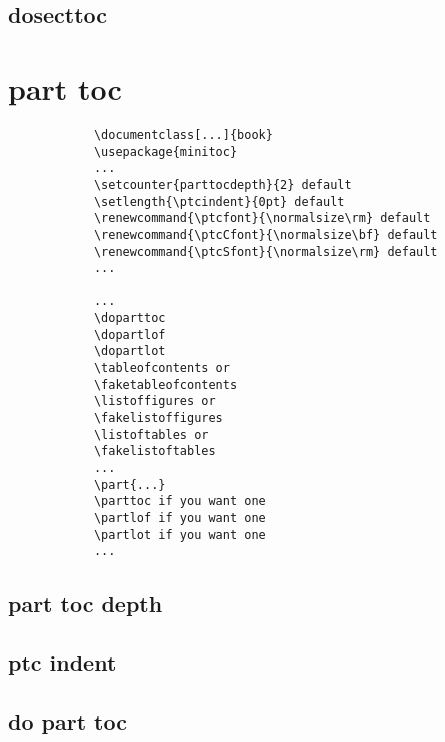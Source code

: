 		\subsection{dosecttoc}



		
		\newpage
	\section{part  toc }



		\singlespace
		\setlength{\fboxsep}{12pt}
		\begin{boxedminipage}[c]{1.0\linewidth}
		\color{blue}
		\begin{verbatim}
			\documentclass[...]{book}
			\usepackage{minitoc}
			...
			\setcounter{parttocdepth}{2} default
			\setlength{\ptcindent}{0pt} default
			\renewcommand{\ptcfont}{\normalsize\rm} default
			\renewcommand{\ptcCfont}{\normalsize\bf} default
			\renewcommand{\ptcSfont}{\normalsize\rm} default
			...
			
			...
			\doparttoc
			\dopartlof
			\dopartlot
			\tableofcontents or
			\faketableofcontents
			\listoffigures or
			\fakelistoffigures
			\listoftables or
			\fakelistoftables
			...
			\part{...}
			\parttoc if you want one
			\partlof if you want one
			\partlot if you want one
			...
		\end{verbatim}
		\end{boxedminipage}
		\color{black}
		\doublespace



		\newpage
		\subsection{part toc depth}
		
		
		\subsection{ptc indent}


		\subsection{do part toc}



